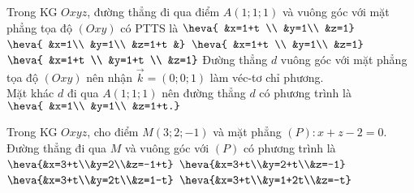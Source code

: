 \begin{ex}%
	Trong KG $Oxyz$, đường thẳng đi qua điểm $A(1; 1; 1)$ và vuông góc với mặt phẳng tọa độ $(Oxy)$ có PTTS là
	\choice
	{$\heva{	&x=1+t \\
			&y=1\\
			&z=1}$}
	{\True $\heva{	&x=1\\
			&y=1\\
			&z=1+t
			&}$}
	{$\heva{	&x=1+t \\
			&y=1\\
			&z=1}$}
	{$\heva{	&x=1+t \\
			&y=1+t \\
			&z=1}$}
	\loigiai
		{Đường thẳng $d$ vuông góc với mặt phẳng tọa độ $(Oxy)$ nên nhận $\overrightarrow{k}=(0; 0; 1)$ làm véc-tơ  chỉ phương.\\
		Mặt khác $d$ đi qua $A(1; 1; 1)$ nên đường thẳng $d$ có phương trình là $\heva{	&x=1\\
			&y=1\\
			&z=1+t.}$
		}
\end{ex}
\begin{ex}%
	Trong KG $Oxyz$, cho điểm $M(3;2 ;-1)$ và mặt phẳng $(P)\colon x+z-2=0$. Đường thẳng đi qua $M$ và vuông góc với $(P)$ có phương trình là
	\choice
	{\True $\heva{&x=3+t\\&y=2\\&z=-1+t}$}
	{$\heva{&x=3+t\\&y=2+t\\&z=-1}$}
	{$\heva{&x=3+t\\&y=2t\\&z=1-t}$}
	{$\heva{&x=3+t\\&y=1+2t\\&z=-t}$}
\end{ex}
